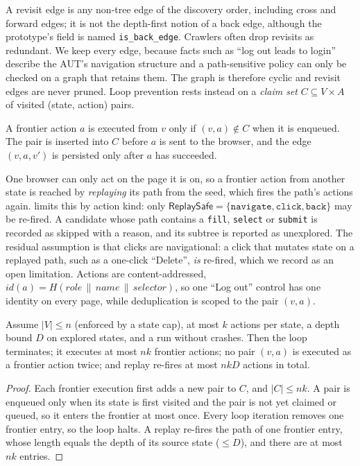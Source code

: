 A revisit edge is any non-tree edge of the discovery order, including cross and
forward edges; it is not the depth-first notion of a back edge, although the
prototype's field is named \texttt{is\_back\_edge}. Crawlers often drop revisits as
redundant. We keep every edge, because facts such as ``log out leads to login''
describe the AUT's navigation structure and a path-sensitive policy can only be
checked on a graph that retains them. The graph is therefore cyclic and revisit
edges are never pruned. Loop prevention rests instead on a \emph{claim set}
$C\subseteq V\times A$ of visited (state, action) pairs.

\begin{definition}
A frontier action $a$ is executed from $v$ only if $(v,a)\notin C$ when it is
enqueued. The pair is inserted into $C$ before $a$ is sent to the browser, and the
edge $(v,a,v')$ is persisted only after $a$ has succeeded.
\end{definition}

One browser can only act on the page it is on, so a frontier action from
another state is reached by \emph{replaying} its path from the seed, which fires
the path's actions again. \sys{} limits this by action kind: only
$\textsf{ReplaySafe}=\{\texttt{navigate},\texttt{click},\texttt{back}\}$ may be
re-fired. A candidate whose path contains a \texttt{fill}, \texttt{select} or
\texttt{submit} is recorded as skipped with a reason, and its subtree is reported
as unexplored. The residual assumption is that clicks are navigational: a click
that mutates state on a replayed path, such as a one-click ``Delete'', \emph{is}
re-fired, which we record as an open limitation. Actions are content-addressed,
$\mathit{id}(a)=H(\mathit{role}\,\|\,\mathit{name}\,\|\,\mathit{selector})$, so one
``Log out'' control has one identity on every page, while deduplication is scoped
to the pair $(v,a)$.

\begin{proposition}
\label{prop:term}
Assume $|V|\le n$ (enforced by a state cap), at most $k$ actions per state, a
depth bound $D$ on explored states, and a run without crashes. Then the loop
terminates; it executes at most $nk$ frontier actions; no pair $(v,a)$ is executed
as a frontier action twice; and replay re-fires at most $nkD$ actions in total.
\end{proposition}
\begin{proof}
Each frontier execution first adds a new pair to $C$, and $|C|\le nk$. A pair is
enqueued only when its state is first visited and the pair is not yet claimed or
queued, so it enters the frontier at most once. Every loop iteration removes one
frontier entry, so the loop halts. A replay re-fires the path of one frontier
entry, whose length equals the depth of its source state ($\le D$), and there are
at most $nk$ entries.
\end{proof}

